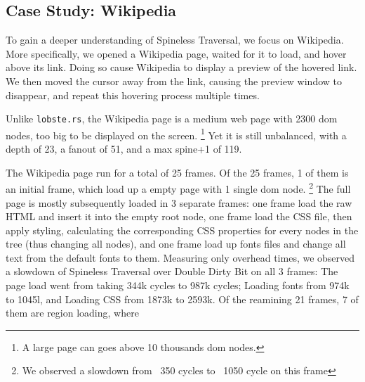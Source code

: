 \subsection{Case Study: Wikipedia}
To gain a deeper understanding of Spineless Traversal, we focus on Wikipedia. More specifically, we opened a Wikipedia page, waited for it to load, and hover above its link. Doing so cause Wikipedia to display a preview of the hovered link. We then moved the cursor away from the link, causing the preview window to disappear, and repeat this hovering process multiple times.

Unlike \texttt{lobste.rs}, the Wikipedia page is a medium web page with 2300 dom nodes, too big to be displayed on the screen.%
\footnote{A large page can goes above 10 thousands dom nodes.}
Yet it is still unbalanced, with a depth of 23, a fanout of 51, and a max spine+1 of 119.

The Wikipedia page run for a total of 25 frames. Of the 25 frames, 1 of them is an initial frame, which load up a empty page with 1 single dom node. \footnote{We observed a slowdown from ~350 cycles to ~1050 cycle on this frame} The full page is mostly subsequently loaded in 3 separate frames: one frame load the raw HTML and insert it into the empty root node, one frame load the CSS file, then apply styling, calculating the corresponding CSS properties for every nodes in the tree (thus changing all nodes), and one frame load up fonts files and change all text from the default fonts to them. Measuring only overhead times, we observed a slowdown of Spineless Traversal over Double Dirty Bit on all 3 frames: The page load went from taking 344k cycles to 987k cycles; Loading fonts from 974k to 1045l, and Loading CSS from 1873k to 2593k. Of the reamining 21 frames, 7 of them are region loading, where 